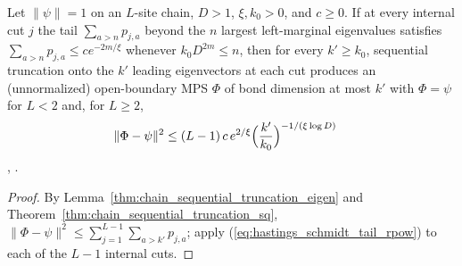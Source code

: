 \begin{lemma}
    \label{thm:hastings_schmidt_tail_mps}
    \leanok
    Let $\|\psi\|=1$ on an $L$-site chain, $D>1$, $\xi,k_0>0$, and $c\ge0$. If
    at every internal cut $j$ the tail $\sum_{a>n}p_{j,a}$ beyond the $n$
    largest left-marginal eigenvalues satisfies
    $\sum_{a>n}p_{j,a}\le ce^{-2m/\xi}$ whenever $k_0D^{2m}\le n$, then for
    every $k'\ge k_0$, sequential truncation onto the $k'$ leading eigenvectors
    at each cut produces an (unnormalized) open-boundary MPS $\Phi$ of bond
    dimension at most $k'$ with $\Phi=\psi$ for $L<2$ and, for $L\ge2$,
    \begin{align}
        \lVert\Phi-\psi\rVert^2
         & \le(L-1)\,c\,e^{2/\xi}\Bigl(\frac{k'}{k_0}\Bigr)^{-1/(\xi\log D)}
        \label{eq:hastings_schmidt_tail_mps}
    \end{align}
    \cite[lines 547--552]{Hastings2007AreaLaw},
    \cite{gap:hastings07_mps_error_measure,gap:hastings07_schmidt_tail_constant}.
\end{lemma}
\begin{proof}\leanok
    By Lemma~\ref{thm:chain_sequential_truncation_eigen}
    and Theorem~\ref{thm:chain_sequential_truncation_sq},
    $\|\Phi-\psi\|^2\le\sum_{j=1}^{L-1}\sum_{a>k'}p_{j,a}$; apply
    (\ref{eq:hastings_schmidt_tail_rpow}) to each of the $L-1$ internal cuts.
\end{proof}


